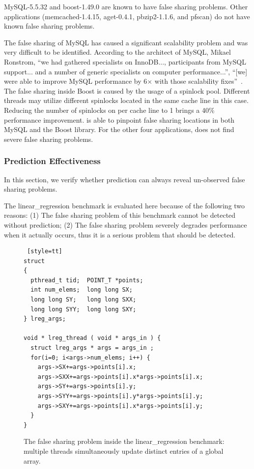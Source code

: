 MySQL-5.5.32 and boost-1.49.0 are known to have false sharing problems. Other applications (memcached-1.4.15, aget-0.4.1,  pbzip2-1.1.6, and pfscan) do not have known false sharing problems.

The false sharing of MySQL has caused a significant scalability problem and was very difficult to be identified.
According to the architect of MySQL, Mikael Ronstrom, ``we had gathered specialists on InnoDB..., participants from MySQL support... and a number of generic specialists on 
computer performance...'', ``[we] were able to improve MySQL performance by 6$\times$ with those scalability fixes''~\cite{mysql}. 
The false sharing inside Boost is caused by the usage of a  spinlock pool. Different threads may utilize different spinlocks located in the same cache line in this case. Reducing the number of spinlocks on per cache line to 1 brings a 40\% performance improvement.
\Predator{} is able to pinpoint false sharing locations in both MySQL and the Boost library. 
For the other four applications, \Predator{} does not find severe false sharing problems.

\subsubsection{Prediction Effectiveness}
\label{sec:predicteval}
In this section, we verify whether prediction can always  reveal un-observed false sharing problems.

The linear\_regression benchmark is evaluated here because of the following two reasons: (1) The false sharing problem of this benchmark cannot be detected without prediction; (2) The false sharing problem severely degrades performance when it actually occurs, thus it is a serious problem that should be detected. 

\begin{figure}
\begin{lstlisting} [style=tt]
struct
{
  pthread_t tid;  POINT_T *points;
  int num_elems;  long long SX;
  long long SY;   long long SXX;
  long long SYY;  long long SXY;
} lreg_args;

void * lreg_thread ( void * args_in ) {
  struct lreg_args * args = args_in ;
  for(i=0; i<args->num_elems; i++) {
    args->SX+=args->points[i].x;
    args->SXX+=args->points[i].x*args->points[i].x;
    args->SY+=args->points[i].y;
    args->SYY+=args->points[i].y*args->points[i].y;
    args->SXY+=args->points[i].x*args->points[i].y;
  }
}
\end{lstlisting}
\caption{The false sharing problem inside the linear\_regression benchmark: multiple threads simultaneously update distinct entries of a global array.
\label{fig:linearregression}}
\end{figure}

